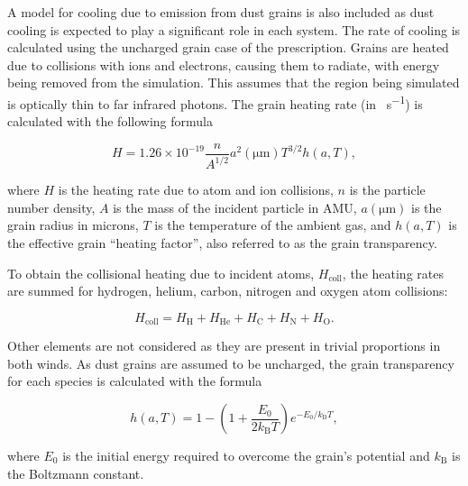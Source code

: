A model for cooling due to emission from dust grains is also included as dust cooling is expected to play a significant role in each system.
The rate of cooling is calculated using the uncharged grain case of the \textcite{dwek_infrared_1981} prescription.
Grains are heated due to collisions with ions and electrons, causing them to radiate, with energy being removed from the simulation.
This assumes that the region being simulated is optically thin to far infrared photons.
The grain heating rate (in \si{\erg\per\second}) is calculated with the following formula

\begin{equation}
    H = 1.26 \times 10^{-19} \frac{n}{A^{1/2}} a^2(\si{\micro\metre}) T^{3/2} h(a,T) , 
\end{equation}

\noindent
where $H$ is the heating rate due to atom and ion collisions, 
$n$ is the particle number density,
$A$ is the mass of the incident particle in AMU,
$a(\si{\micro\metre})$ is the grain radius in microns,
$T$ is the temperature of the ambient gas,
and $h(a,T)$ is the effective grain ``heating factor'', also referred to as the grain transparency. 

To obtain the collisional heating due to incident atoms, $H_\text{coll}$, the heating rates are summed for hydrogen, helium, carbon, nitrogen and oxygen atom collisions:

\begin{equation}
  H_\text{coll} = H_\text{H} + H_\text{He} + H_\text{C} + H_\text{N} + H_\text{O} .
\end{equation}

\noindent
Other elements are not considered as they are present in trivial proportions in both winds.
As dust grains are assumed to be uncharged, the grain transparency for each species is calculated with the formula

\begin{equation}
  h(a,T) = 1 - \left( 1 + \frac{E_0}{2 k_\text{B} T} \right) e^{- E_0 / k_\text{B} T} ,
\end{equation}

\noindent
where $E_0$ is the initial energy required to overcome the grain's potential and $k_\text{B}$ is the Boltzmann constant.

